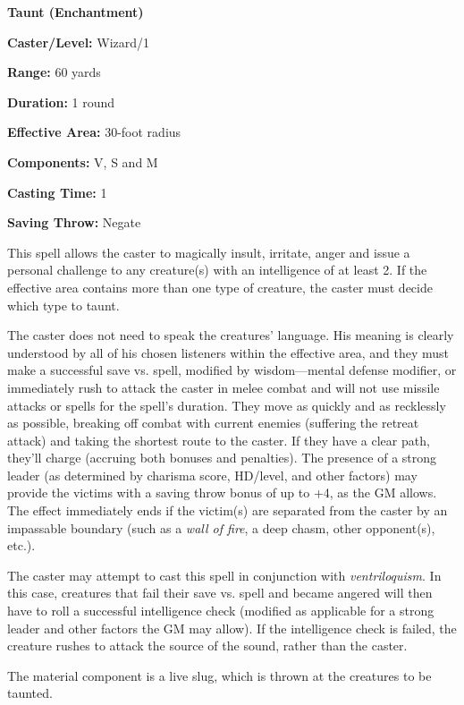 \begin{multicols}{2}
\begin{minipage}{\columnwidth}
\noindent \textbf{Taunt (Enchantment)}

\noindent \textbf{Caster/Level:} Wizard/1

\noindent \textbf{Range:} 60 yards

\noindent \textbf{Duration:} 1 round

\noindent \textbf{Effective Area:} 30-foot radius

\noindent \textbf{Components:} V, S and M

\noindent \textbf{Casting Time:} 1

\noindent \textbf{Saving Throw:} Negate

\end{minipage}

This spell allows the caster to magically insult, irritate, anger and issue a personal challenge to any creature(s) with an intelligence of at least 2.  If the effective area contains more than one type of creature, the caster must decide which type to taunt.

The caster does not need to speak the creatures' language.  His meaning is clearly understood by all of his chosen listeners within the effective area, and they must make a successful save vs. spell, modified by wisdom---mental defense modifier, or immediately rush to attack the caster in melee combat and will not use missile attacks or spells for the spell's duration.  They move as quickly and as recklessly as possible, breaking off combat with current enemies (suffering the retreat attack) and taking the shortest route to the caster.  If they have a clear path, they'll charge (accruing both bonuses and penalties).  The presence of a strong leader (as determined by charisma score, HD/level, and other factors) may provide the victims with a saving throw bonus of up to +4, as the GM allows.  The effect immediately ends if the victim(s) are separated from the caster by an impassable boundary (such as a \textit{wall of fire}, a deep chasm, other opponent(s), etc.).  

The caster may attempt to cast this spell in conjunction with \textit{ventriloquism}.  In this case, creatures that fail their save vs. spell and became angered will then have to roll a successful intelligence check (modified as applicable for a strong leader and other factors the GM may allow).  If the intelligence check is failed, the creature rushes to attack the source of the sound, rather than the caster.

The material component is a live slug, which is thrown at the creatures to be taunted.


\end{multicols}
